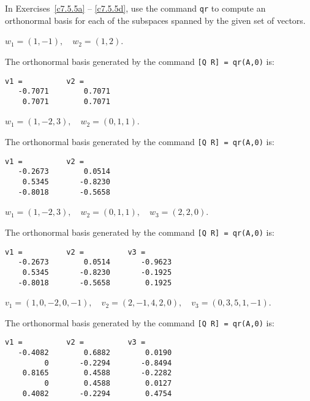 \documentclass{ximera}
\begin{document}
In Exercises~\ref{c7.5.5a} -- \ref{c7.5.5d}, use the \Matlab command
{\tt qr} to compute an orthonormal basis for each of the subspaces spanned
by the given set of vectors.
\begin{computerExercise} \label{c7.5.5a}
$w_1=(1,-1),\quad w_2=(1,2)$.

\begin{solution}

The orthonormal basis generated by the command {\tt [Q R] = qr(A,0)} is:
\begin{verbatim}
v1 =          v2 =
   -0.7071        0.7071
    0.7071        0.7071
\end{verbatim}

\end{solution}
\end{computerExercise}
\begin{computerExercise} \label{c7.5.5b}
$w_1=(1,-2,3),\quad w_2=(0,1,1)$.

\begin{solution}

The orthonormal basis generated by the command {\tt [Q R] = qr(A,0)} is:

\begin{verbatim}
v1 =          v2 =
   -0.2673        0.0514
    0.5345       -0.8230
   -0.8018       -0.5658
\end{verbatim}

\end{solution}
\end{computerExercise}
\begin{computerExercise} \label{c7.5.5c}
$w_1=(1,-2,3),\quad w_2=(0,1,1),\quad w_3=(2,2,0)$.

\begin{solution}

The orthonormal basis generated by the command {\tt [Q R] = qr(A,0)} is:
\begin{verbatim}
v1 =          v2 =          v3 = 
   -0.2673        0.0514       -0.9623
    0.5345       -0.8230       -0.1925
   -0.8018       -0.5658        0.1925
\end{verbatim}

\end{solution}
\end{computerExercise}
\begin{computerExercise} \label{c7.5.5d}
$v_1=(1,0,-2,0,-1),\quad v_2=(2,-1,4,2,0),\quad v_3=(0,3,5,1,-1)$.

\begin{solution}

The orthonormal basis generated by the command {\tt [Q R] = qr(A,0)} is:

\begin{verbatim}
v1 =          v2 =          v3 = 
   -0.4082        0.6882        0.0190
         0       -0.2294       -0.8494
    0.8165        0.4588       -0.2282
         0        0.4588        0.0127
    0.4082       -0.2294        0.4754
\end{verbatim}

\end{solution}
\end{computerExercise}
\end{document}
